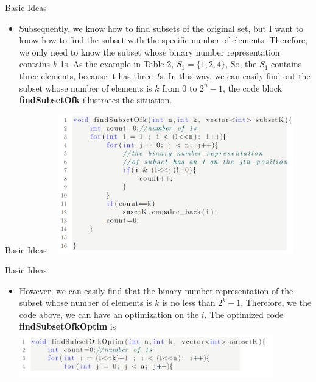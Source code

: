 \documentclass[hyperref={pdfpagelabels=false}]{beamer}
\begin{document}
\begin{frame}{Basic Ideas}
    \begin{itemize}
        \item Subsequently, we know how to find subsets of the original set, but I want to know how to find the subset with the specific number of elements. Therefore, we only need to know the subset whose binary number representation contains $k$ 1s. As the example in Table 2, $S_1=\{1,2,4\}$, So, the $S_1$ contains three elements, because it has three \emph{1}s. In this way, we can easily find out the subset whose number of elements is $k$ from $0$ to $2^n-1$, the code block \textbf{findSubsetOfk} illustrates the situation.\\
    \end{itemize}
\end{frame}

\begin{frame}{Basic Ideas}
    \includegraphics[width=11cm,height=6cm]{Figures/1.PNG}
\end{frame}

\begin{frame}{Basic Ideas}
    \begin{itemize}
        \item  However, we can easily find that the binary number representation of the subset whose number of elements is $k$ is no less than $2^k-1$. Therefore, we the code above, we can have an optimization on the $i$. The optimized code \textbf{findSubsetOfkOptim} is\\
        \includegraphics[width=11cm,height=2cm]{Figures/2.PNG}
    \end{itemize}
\end{frame}
\end{document}
